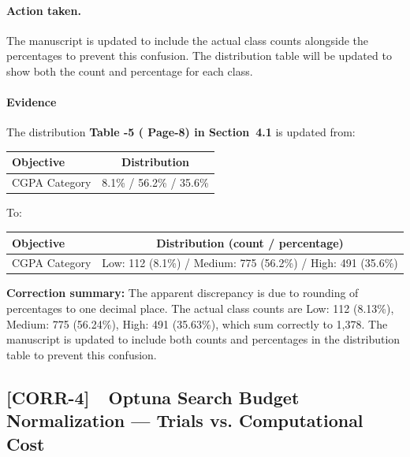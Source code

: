 \documentclass[11pt,a4paper]{article}
\newcommand{\cid}[1]{\textcolor{revred}{\textbf{[#1]}}}
\newcommand{\sectref}[1]{Section~#1}
\newcommand{\stress}[1]{\textbf{#1}}
\begin{document}
\paragraph{Action taken.} The manuscript is updated to include the actual class counts alongside the percentages to prevent this confusion. The distribution table will be updated to show both the count and percentage for each class.

\paragraph{Evidence } The distribution \stress{Table -5 ( Page-8) in \sectref{4.1} } is updated from:

\begin{center}\small
\begin{tabular}{l c}
\toprule
\textbf{Objective} & \textbf{Distribution} \\
\midrule
CGPA Category & 8.1\% / 56.2\% / 35.6\% \\
\bottomrule
\end{tabular}
\end{center}

To:

\begin{center}\small
\begin{tabular}{l c}
\toprule
\textbf{Objective} & \textbf{Distribution (count / percentage)} \\
\midrule
CGPA Category & Low: 112 (8.1\%) / Medium: 775 (56.2\%) / High: 491 (35.6\%) \\
\bottomrule
\end{tabular}
\end{center}

\begin{correctionbox}
\noindent \textbf{Correction summary:} The apparent discrepancy is due to rounding of percentages to one decimal place. The actual class counts are Low: 112 (8.13\%), Medium: 775 (56.24\%), High: 491 (35.63\%), which sum correctly to 1,378. The manuscript is updated to include both counts and percentages in the distribution table to prevent this confusion.
\end{correctionbox}


\subsection*{\cid{CORR-4}~~Optuna Search Budget Normalization — Trials vs. Computational Cost}
\end{document}
